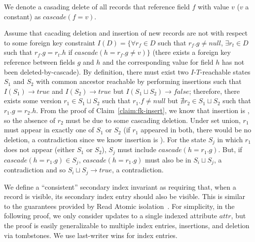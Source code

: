 We denote a casading delete of all records that reference field $f$ with value $v$ ($v$ a constant) as $cascade(f=v)$.

\begin{claim}
\label{claim:fk-cascade}
Assume that cacading deletion and insertion of new records are not \iconfluent with respect to some foreign key constraint $I(D) = \{\forall r_f \in D$ such that $r_f.g \neq null$, $\exists r_t \in D$ such that $r_f.g = r_t.h$ if $cascade(h=r_f.g \neq v)\}$ (there exists a foreign key reference between fields $g$ and $h$ and the corresponding value for field $h$ has not been deleted-by-cascade). By definition, there must exist two $I$-$T$-reachable states $S_1$ and $S_2$ with common ancestor reachable by performing insertions such that $I(S_1) \rightarrow true$ and $I(S_2) \rightarrow true$ but $I(S_1 \sqcup S_2) \rightarrow false$; therefore, there exists some version $r_1 \in S_1 \sqcup S_2$ such that $r_1.f \neq null$ but $\nexists r_2 \in S_1 \sqcup S_2$ such that $r_1.g = r_2.h$. From the proof of Claim~\ref{claim:fk-insert}, we know that insertion is \iconfluent, so the absence of $r_2$ must be due to some cascading deletion. Under set union, $r_1$ must appear in exactly one of $S_1$ or $S_2$ (if $r_1$ appeared in both, there would be no deletion, a contradiction since we know insertion is \iconfluent). For the state $S_j$ in which $r_1$ does not appear (either $S_1$ or $S_2$), $S_j$ must include $cascade(h=r_1.g)$. But, if $cascade(h=r_1.g) \in S_j$, $cascade(h=r_1.g)$ must also be in $S_i \sqcup S_j$, a contradiction and so $S_i \sqcup S_j \rightarrow true$, a contradiction.
\end{claim}

We define a ``consistent'' secondary index invariant as requiring that, when a record is visible, its secondary index entry should also be visible. This is similar to the guarantees provided by Read Atomic isolation~\cite{ramp-txns}. For simplicity, in the following proof, we only consider updates to a single indexed attribute $attr$, but the proof is easily generalizable to multiple index entries, insertions, and deletion via tombstones. We use last-writer wins for index entries.

